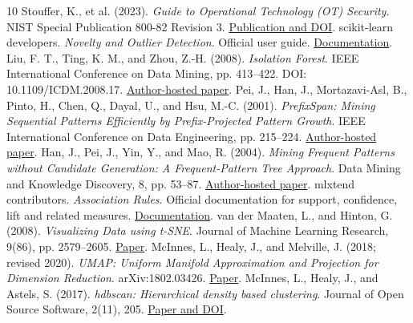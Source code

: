 \documentclass[11pt,a4paper]{article}
\begin{document}
\begingroup
\small
\renewcommand{\section}[2]{}
\begin{thebibliography}{10}
 Stouffer, K., et al. (2023). \emph{Guide to Operational Technology (OT) Security}. NIST Special Publication 800-82 Revision 3. \href{\detokenize{https://doi.org/10.6028/NIST.SP.800-82r3}}{Publication and DOI}.
 scikit-learn developers. \emph{Novelty and Outlier Detection}. Official user guide. \href{\detokenize{https://scikit-learn.org/stable/modules/outlier_detection.html}}{Documentation}.
 Liu, F. T., Ting, K. M., and Zhou, Z.-H. (2008). \emph{Isolation Forest}. IEEE International Conference on Data Mining, pp. 413--422. DOI: 10.1109/ICDM.2008.17. \href{\detokenize{https://cs.nju.edu.cn/zhouzh/zhouzh.files/publication/icdm08b.pdf}}{Author-hosted paper}.
 Pei, J., Han, J., Mortazavi-Asl, B., Pinto, H., Chen, Q., Dayal, U., and Hsu, M.-C. (2001). \emph{PrefixSpan: Mining Sequential Patterns Efficiently by Prefix-Projected Pattern Growth}. IEEE International Conference on Data Engineering, pp. 215--224. \href{\detokenize{https://www.cs.sfu.ca/~jpei/publications/span.pdf}}{Author-hosted paper}.
 Han, J., Pei, J., Yin, Y., and Mao, R. (2004). \emph{Mining Frequent Patterns without Candidate Generation: A Frequent-Pattern Tree Approach}. Data Mining and Knowledge Discovery, 8, pp. 53--87. \href{\detokenize{https://www.cs.sfu.ca/~jpei/publications/dami03_fpgrowth.pdf}}{Author-hosted paper}.
 mlxtend contributors. \emph{Association Rules}. Official documentation for support, confidence, lift and related measures. \href{\detokenize{https://rasbt.github.io/mlxtend/user_guide/frequent_patterns/association_rules/}}{Documentation}.
 van der Maaten, L., and Hinton, G. (2008). \emph{Visualizing Data using t-SNE}. Journal of Machine Learning Research, 9(86), pp. 2579--2605. \href{\detokenize{https://jmlr.org/papers/v9/vandermaaten08a.html}}{Paper}.
 McInnes, L., Healy, J., and Melville, J. (2018; revised 2020). \emph{UMAP: Uniform Manifold Approximation and Projection for Dimension Reduction}. arXiv:1802.03426. \href{\detokenize{https://arxiv.org/abs/1802.03426}}{Paper}.
 McInnes, L., Healy, J., and Astels, S. (2017). \emph{hdbscan: Hierarchical density based clustering}. Journal of Open Source Software, 2(11), 205. \href{\detokenize{https://joss.theoj.org/papers/10.21105/joss.00205}}{Paper and DOI}.

\end{thebibliography}
\end{document}
